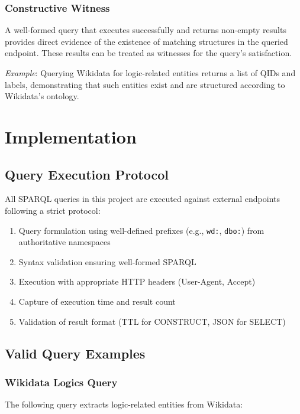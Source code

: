 \subsubsection{Constructive Witness}

A well-formed query that executes successfully and returns non-empty results provides direct evidence of the existence of matching structures in the queried endpoint. These results can be treated as witnesses \cite{negri2011proof} for the query's satisfaction.

\textit{Example}: Querying Wikidata for logic-related entities returns a list of QIDs and labels, demonstrating that such entities exist and are structured according to Wikidata's ontology.

\section{Implementation}

\subsection{Query Execution Protocol}

All SPARQL queries in this project are executed against external endpoints following a strict protocol:

\begin{enumerate}
  \item Query formulation using well-defined prefixes (e.g., \texttt{wd:}, \texttt{dbo:}) from authoritative namespaces
  \item Syntax validation ensuring well-formed SPARQL
  \item Execution with appropriate HTTP headers (User-Agent, Accept)
  \item Capture of execution time and result count
  \item Validation of result format (TTL for CONSTRUCT, JSON for SELECT)
\end{enumerate}

\subsection{Valid Query Examples}

\subsubsection{Wikidata Logics Query}

The following query extracts logic-related entities from Wikidata:

